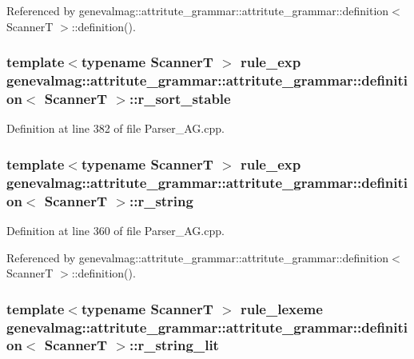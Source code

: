 Referenced by genevalmag::attritute\_\-grammar::attritute\_\-grammar::definition$<$ ScannerT $>$::definition().\hypertarget{structgenevalmag_1_1attritute__grammar_1_1definition_f75798f632bc1b7cdd2aa264bad4a642}{
\subsubsection[{r\_\-sort\_\-stable}]{\setlength{\rightskip}{0pt plus 5cm}template$<$typename ScannerT $>$ {\bf rule\_\-exp} genevalmag::attritute\_\-grammar::attritute\_\-grammar::definition$<$ ScannerT $>$::{\bf r\_\-sort\_\-stable}}}
\label{structgenevalmag_1_1attritute__grammar_1_1definition_f75798f632bc1b7cdd2aa264bad4a642}




Definition at line 382 of file Parser\_\-AG.cpp.\hypertarget{structgenevalmag_1_1attritute__grammar_1_1definition_15e7197a76310bda96b0fb8b33e85f32}{
\subsubsection[{r\_\-string}]{\setlength{\rightskip}{0pt plus 5cm}template$<$typename ScannerT $>$ {\bf rule\_\-exp} genevalmag::attritute\_\-grammar::attritute\_\-grammar::definition$<$ ScannerT $>$::{\bf r\_\-string}}}
\label{structgenevalmag_1_1attritute__grammar_1_1definition_15e7197a76310bda96b0fb8b33e85f32}




Definition at line 360 of file Parser\_\-AG.cpp.

Referenced by genevalmag::attritute\_\-grammar::attritute\_\-grammar::definition$<$ ScannerT $>$::definition().\hypertarget{structgenevalmag_1_1attritute__grammar_1_1definition_8861569b4a66eb19bbc74f07e640c989}{
\subsubsection[{r\_\-string\_\-lit}]{\setlength{\rightskip}{0pt plus 5cm}template$<$typename ScannerT $>$ {\bf rule\_\-lexeme} genevalmag::attritute\_\-grammar::attritute\_\-grammar::definition$<$ ScannerT $>$::{\bf r\_\-string\_\-lit}}}
\label{structgenevalmag_1_1attritute__grammar_1_1definition_8861569b4a66eb19bbc74f07e640c989}




